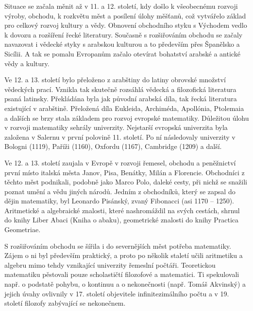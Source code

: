       Situace se začala měnit až v 11. a 12. století, kdy došlo k všeobecnému rozvoji výroby,
      obchodu, k rozkvětu měst a posílení úlohy měšťanů, což vytvářelo základ pro celkový rozvoj
      kultury a vědy. Obnovení obchodního styku s Východem vedlo k dovozu a rozšíření řecké
      literatury. Současně s rozšiřováním obchodu se začaly navazovat i vědecké styky s arabskou
      kulturou a to především přes Španělsko a Sicílii. A tak se pomalu Evropanům začalo otevírat
      bohatství arabské a antické vědy a kultury.
      
      Ve 12. a 13. století bylo přeloženo z arabštiny do latiny obrovské množství vědeckých prací.
      Vznikla tak skutečně rozsáhlá vědecká a filozofická literatura psaná latinsky. Překládána byla
      jak původní arabská díla, tak řecká literatura existující v arabštině. Přeložená díla
      Eukleida, Archiméda, Apollónia, Ptolemaia a dalších se brzy stala základem pro rozvoj evropské
      matematiky. Důležitou úlohu v rozvoji matematiky sehrály univerzity. Nejstarší evropská
      univerzita byla založena v Salernu v první polovině 11. století. Po ní následovaly univerzity
      v Bologni (1119), Paříži (1160), Oxfordu (1167), Cambridge (1209) a další.

      Ve 12. a 13. století zaujala v Evropě v rozvoji řemesel, obchodu a peněžnictví první místo
      italská města Janov, Pisa, Benátky, Milán a Florencie. Obchodníci z těchto měst podnikali,
      podobně jako Marco Polo, daleké cesty, při nichž se snažili poznat umění a vědu jiných národů.
      Jedním z obchodníků, který se zapsal do dějin matematiky, byl Leonardo Pisánský, zvaný
      Fibonacci (asi 1170 – 1250). Aritmetické a algebraické znalosti, které nashromáždil na svých
      cestách, shrnul do knihy Liber Abaci (Kniha o abaku), geometrické znalosti do knihy Practica
      Geometriae.

      S rozšiřováním obchodu se šířila i do severnějších měst potřeba matematiky. Zájem o ni byl
      především praktický, a proto po několik staletí učili aritmetiku a algebru mimo tehdy
      vznikající univerzity řemeslní počtáři. Teoretickou matematiku pěstovali pouze scholastičtí
      filozofové a matematici. Ti spekulovali např. o podstatě pohybu, o kontinuu a o nekonečnosti
      (např. Tomáš Akvinský) a jejich úvahy ovlivnily v 17. století objevitele infinitezimálního
      počtu a v 19. století filozofy zabývající se nekonečnem.

